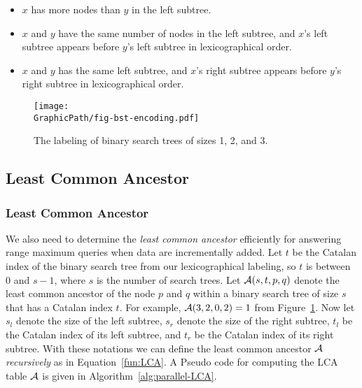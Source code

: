 \begin{itemize}
\item $x$ has more nodes than $y$ in the left subtree.
\item $x$ and $y$ have the same number of nodes in the left subtree,
  and $x$'s left subtree appears before $y$'s left subtree in
  lexicographical order.
\item $x$ and $y$ has the same left subtree, and $x$'s right subtree
  appears before $y$'s right subtree in lexicographical order.
\end{itemize}

\begin{figure}[!thb]
  \centering
  \texttt{[image: \\GraphicPath/fig-bst-encoding.pdf]}
  \caption{The labeling of binary search trees of sizes 1, 2, and 3.}
  \label{fig:labelingBST}
\end{figure}


\ifdefined\MasterThesis
\subsection{Least Common Ancestor}
\else
\subsubsection{Least Common Ancestor}
\fi

We also need to determine the {\em least common ancestor} efficiently
for answering range maximum queries when data are incrementally added.
Let $t$ be the Catalan index of the binary search tree from our
lexicographical labeling, so $t$ is between 0 and $s - 1$, where $s$
is the number of search trees.  Let ${\cal A}(s, t, p, q)$ denote the
least common ancestor of the node $p$ and $q$ within a binary search
tree of size $s$ that has a Catalan index $t$.  For example, ${\cal
  A}(3, 2, 0, 2) = 1$ from Figure~\ref{fig:labelingBST}.  Now let
$s_l$ denote the size of the left subtree, $s_r$ denote the size of
the right subtree, $t_l$ be the Catalan index of its left subtree, and
$t_r$ be the Catalan index of its right subtree.  With these notations
we can define the least common ancestor $\cal A$ {\em recursively} as
in Equation~\ref{fun:LCA}.  A Pseudo code for computing the LCA table
$\cal A$ is given in Algorithm~\ref{alg:parallel-LCA}.





